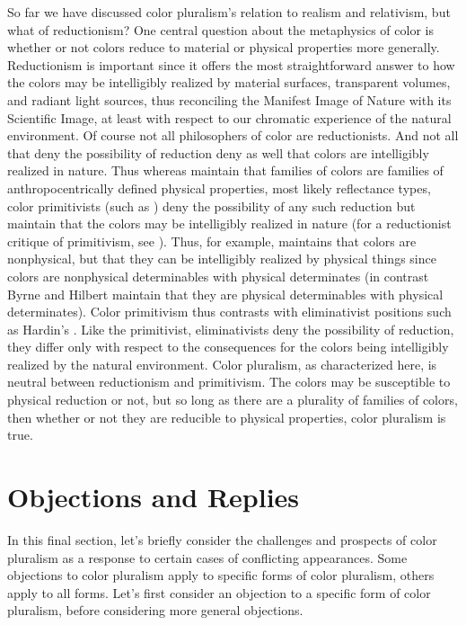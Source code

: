 \documentclass[12pt]{article}
\begin{document}
So far we have discussed color pluralism's relation to realism and relativism, but what of reductionism? One central question about the metaphysics of color is whether or not colors reduce to material or physical properties more generally. Reductionism is important since it offers the most straightforward answer to how the colors may be intelligibly realized by material surfaces, transparent volumes, and radiant light sources, thus reconciling the Manifest Image of Nature with its Scientific Image, at least with respect to our chromatic experience of the natural environment. Of course not all philosophers of color are reductionists. And not all that deny the possibility of reduction deny as well that colors are intelligibly realized in nature. Thus whereas \citet{Hilbert:1987jq,Byrne:1997dk,Byrne:2003we} maintain that families of colors are families of anthropocentrically defined physical properties, most likely reflectance types, color primitivists (such as \citealt{Campbell:1997dq,Broackes:1997pa,McGinn:1996oe,Yablo:1995fk,Gert:2008ge,Allen:2011bs}) deny the possibility of any such reduction but maintain that the colors may be intelligibly realized in nature (for a reductionist critique of primitivism, see \citealt{Byrne:2006bh}). Thus, for example, \citet{Yablo:1995fk} maintains that colors are nonphysical, but that they can be intelligibly realized by physical things since colors are nonphysical determinables with physical determinates (in contrast Byrne and Hilbert maintain that they are physical determinables with physical determinates). Color primitivism thus contrasts with eliminativist positions such as Hardin's \citeyearpar{Hardin:1993kn}. Like the primitivist, eliminativists deny the possibility of reduction, they differ only with respect to the consequences for the colors being intelligibly realized by the natural environment. Color pluralism, as characterized here, is neutral between reductionism and primitivism. The colors may be susceptible to physical reduction or not, but so long as there are a plurality of families of colors, then whether or not they are reducible to physical properties, color pluralism is true.


\section{Objections and Replies} %
\label{sec:objections_and_replies}

In this final section, let's briefly consider the challenges and prospects of color pluralism as a response to certain cases of conflicting appearances. Some objections to color pluralism apply to specific forms of color pluralism, others apply to all forms. Let's first consider an objection to a specific form of color pluralism, before considering more general objections.
\end{document}
